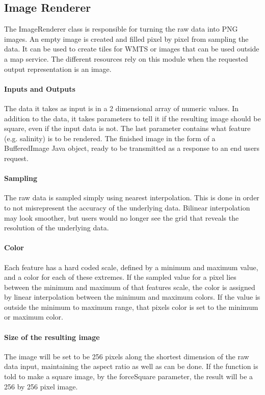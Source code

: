 \documentclass[11pt,a4paper,titlepage,oneside]{report}
\begin{document}
\subsection{Image Renderer}
The ImageRenderer class is responsible for turning the raw data into \gls{PNG} images. An empty image is created and filled pixel by pixel from sampling the data. It can be used to create tiles for \gls{WMTS} or images that can be used outside a map service. The different resources rely on this module when the requested output representation is an image.
\paragraph{Inputs and Outputs}
The data it takes as input is in a 2 dimensional array of numeric values. In addition to the data, it takes parameters to tell it if the resulting image should be square, even if the input data is not. The last parameter contains what feature (e.g. salinity) is to be rendered. The finished image in the form of a BufferedImage Java object, ready to be transmitted as a response to an end users request.
\paragraph{Sampling}
The raw data is sampled simply using nearest interpolation. This is done in order to not misrepresent the accuracy of the underlying data. Bilinear interpolation may look smoother, but users would no longer see the grid that reveals the resolution of the underlying data.
\paragraph{Color}
Each feature has a hard coded scale, defined by a minimum and maximum value, and a color for each of these extremes. If the sampled value for a pixel lies between the minimum and maximum of that features scale, the color is assigned by linear interpolation between the minimum and maximum colors. If the value is outside the minimum to maximum range, that pixels color is set to the minimum or maximum color.
\paragraph{Size of the resulting image}
The image will be set to be 256 pixels along the shortest dimension of the raw data input, maintaining the aspect ratio as well as can be done. If the function is told to make a square image, by the forceSquare parameter, the result will be a 256 by 256 pixel image.
\end{document}
